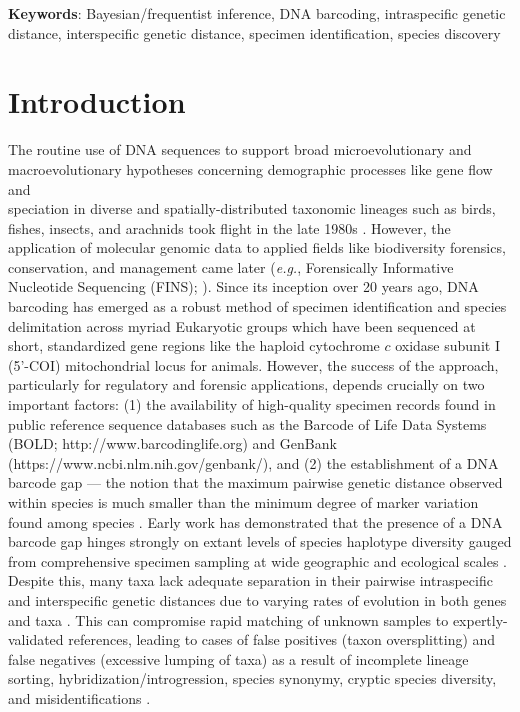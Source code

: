 \documentclass[12pt]{article}
\begin{document}
\textbf{Keywords}: Bayesian/frequentist inference, DNA barcoding, intraspecific genetic \\ distance, interspecific genetic distance, specimen identification, species discovery

\vspace{2mm}

\section{Introduction}

The routine use of DNA sequences to support broad microevolutionary and \\ macroevolutionary hypotheses concerning demographic processes like gene flow and \\ speciation in diverse and spatially-distributed taxonomic lineages such as birds, fishes, insects, and arachnids took flight in the late 1980s \citep{avise1987intraspecific}. However, the application of molecular genomic data to applied fields like biodiversity forensics, conservation, and management came later (\textit{e.g.}, Forensically Informative Nucleotide Sequencing (FINS); \citet{bartlett1992fins}). Since its inception over 20 years ago, DNA barcoding \citep{hebert2003biological, hebert2003barcoding} has emerged as a robust method of specimen identification and species delimitation across myriad Eukaryotic groups which have been sequenced at short, standardized gene regions like the haploid cytochrome $c$ oxidase subunit I (5'-COI) mitochondrial locus for animals. However, the success of the approach, particularly for regulatory and forensic applications, depends crucially on two important factors: (1) the availability of high-quality specimen records found in public reference sequence databases such as the Barcode of Life Data Systems (BOLD; http://www.barcodinglife.org) \citep{ratnasingham2007bold} and GenBank (https://www.ncbi.nlm.nih.gov/genbank/), and (2) the establishment of a DNA barcode gap --- the notion that the maximum pairwise genetic distance observed within species is much smaller than the minimum degree of marker variation found among species \citep{meyer2005dna, meier2008use}. Early work has demonstrated that the presence of a DNA barcode gap hinges strongly on extant levels of species haplotype diversity gauged from comprehensive specimen sampling at wide geographic and ecological scales \citep{bergsten2012effect, candek2015dna}. Despite this, many taxa lack adequate separation in their pairwise intraspecific and interspecific genetic distances due to varying rates of evolution in both genes and taxa \citep{pentinsaari2016molecular}. This can compromise rapid matching of unknown samples to expertly-validated references, leading to cases of false positives (taxon oversplitting) and false negatives (excessive lumping of taxa) as a result of incomplete lineage sorting, hybridization/introgression, species synonymy, cryptic species diversity, and misidentifications \citep{hubert2015dna, phillips2022lack}.
\end{document}
